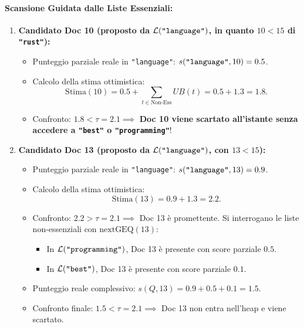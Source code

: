\paragraph{Scansione Guidata dalle Liste Essenziali:}
\begin{enumerate}
    \item \textbf{Candidato Doc 10 (proposto da $\mathcal{L}(\text{\texttt{"language"}})$, in quanto $10 < 15$ di \texttt{"rust"}):}
    \begin{itemize}
        \item Punteggio parziale reale in \texttt{"language"}: $s(\text{\texttt{"language"}}, 10) = 0.5$.
        \item Calcolo della stima ottimistica:
        \begin{equation*}
            \text{Stima}(10) = 0.5 + \sum_{t \in \text{Non-Ess}} UB(t) = 0.5 + 1.3 = 1.8.
        \end{equation*}
        \item Confronto: $1.8 < \tau = 2.1 \implies$ \textbf{Doc 10 viene scartato all'istante senza accedere a \texttt{"best"} o \texttt{"programming"}}!
    \end{itemize}
    \item \textbf{Candidato Doc 13 (proposto da $\mathcal{L}(\text{\texttt{"language"}})$, con $13 < 15$):}
    \begin{itemize}
        \item Punteggio parziale reale in \texttt{"language"}: $s(\text{\texttt{"language"}}, 13) = 0.9$.
        \item Calcolo della stima ottimistica:
        \begin{equation*}
            \text{Stima}(13) = 0.9 + 1.3 = 2.2.
        \end{equation*}
        \item Confronto: $2.2 > \tau = 2.1 \implies$ Doc 13 \`e promettente. Si interrogano le liste non-essenziali con $\text{nextGEQ}(13)$:
        \begin{itemize}
            \item In $\mathcal{L}(\text{\texttt{"programming"}})$, Doc 13 \`e presente con score parziale $0.5$.
            \item In $\mathcal{L}(\text{\texttt{"best"}})$, Doc 13 \`e presente con score parziale $0.1$.
        \end{itemize}
        \item Punteggio reale complessivo: $s(Q, 13) = 0.9 + 0.5 + 0.1 = 1.5$.
        \item Confronto finale: $1.5 < \tau = 2.1 \implies$ Doc 13 non entra nell'heap e viene scartato.

\end{itemize}
\end{enumerate}
